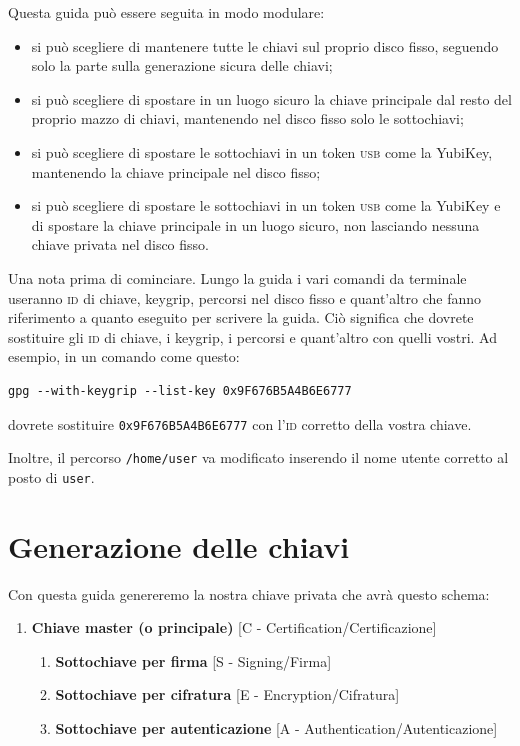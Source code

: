 \documentclass[a4paper,10pt]{article}
\begin{document}
Questa guida può essere seguita in modo modulare:

\begin{itemize}
 \item si può scegliere di mantenere tutte le chiavi sul proprio disco fisso, seguendo solo la parte sulla generazione sicura delle chiavi;
 \item si può scegliere di spostare in un luogo sicuro la chiave principale dal resto del proprio mazzo di chiavi, mantenendo nel disco fisso solo le sottochiavi;
 \item si può scegliere di spostare le sottochiavi in un token \textsc{usb} come la YubiKey, mantenendo la chiave principale nel disco fisso;
 \item si può scegliere di spostare le sottochiavi in un token \textsc{usb} come la YubiKey e di spostare la chiave principale in un luogo sicuro, non lasciando nessuna chiave privata nel disco fisso.
\end{itemize}

Una nota prima di cominciare. Lungo la guida i vari comandi da terminale useranno \textsc{id} di chiave, keygrip, percorsi nel disco fisso e quant'altro che fanno riferimento a quanto eseguito per scrivere la guida. Ciò significa che dovrete sostituire gli \textsc{id} di chiave, i keygrip, i percorsi e quant'altro con quelli vostri. Ad esempio, in un comando come questo:

\begin{lstlisting}
gpg --with-keygrip --list-key 0x9F676B5A4B6E6777
\end{lstlisting}

dovrete sostituire \texttt{0x9F676B5A4B6E6777} con l'\textsc{id} corretto della vostra chiave.

Inoltre, il percorso \texttt{/home/user} va modificato inserendo il nome utente corretto al posto di \texttt{user}.

\section{Generazione delle chiavi}

Con questa guida genereremo la nostra chiave privata che avrà questo schema:

\begin{enumerate}
 \item \textbf{Chiave master (o principale)} [C - Certification/Certificazione]
 \begin{enumerate}
  \item \textbf{Sottochiave per firma} [S - Signing/Firma]
  \item \textbf{Sottochiave per cifratura} [E - Encryption/Cifratura]
  \item \textbf{Sottochiave per autenticazione} [A - Authentication/Autenticazione]
 \end{enumerate}
\end{enumerate}
\end{document}
